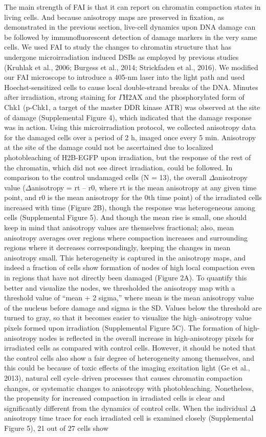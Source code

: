 The main strength of FAI is that it can report on chromatin compaction states in living cells. And because anisotropy maps are preserved in fixation, as demonstrated in the previous section, live-cell dynamics upon DNA damage can be followed by immunofluorescent detection of damage markers in the very same cells. We used FAI to study the changes to chromatin structure that has undergone microirradiation induced DSBs as employed by previous studies (Kruhlak et al., 2006; Burgess et al., 2014; Strickfaden et al., 2016). We modified our FAI microscope to introduce a 405-nm laser into the light path and used Hoechst-sensitized cells to cause local double-strand breaks of the DNA. Minutes after irradiation, strong staining for $\Gamma$H2AX and the phosphorylated form of Chk1 (p-Chk1, a target of the master DDR kinase ATR) was observed at the site of damage (Supplemental Figure 4), which indicated that the damage response was in action. Using this microirradiation protocol, we collected anisotropy data for the damaged cells over a period of 2 h, imaged once every 5 min. Anisotropy at the site of the damage could not be ascertained due to localized photobleaching of H2B-EGFP upon irradiation, but the response of the rest of the chromatin, which did not see direct irradiation, could be followed. In comparison to the control undamaged cells (N = 13), the overall $\Delta$anisotropy value ($\Delta$anisotropy = rt – r0, where rt is the mean anisotropy at any given time point, and r0 is the mean anisotropy for the 0th time point) of the irradiated cells increased with time (Figure 2B), though the response was heterogeneous among cells (Supplemental Figure 5). And though the mean rise is small, one should keep in mind that anisotropy values are themselves fractional; also, mean anisotropy averages over regions where compaction increases and surrounding regions where it decreases correspondingly, keeping the changes in mean anisotropy small. This heterogeneity is captured in the anisotropy maps, and indeed a fraction of cells show formation of nodes of high local compaction even in regions that have not directly been damaged (Figure 2A). To quantify this better and visualize the nodes, we thresholded the anisotropy map with a threshold value of “mean + 2 sigma,” where mean is the mean anisotropy value of the nucleus before damage and sigma is the SD. Values below the threshold are turned to gray, so that it becomes easier to visualize the high–anisotropy value pixels formed upon irradiation (Supplemental Figure 5C). The formation of high-anisotropy nodes is reflected in the overall increase in high-anisotropy pixels for irradiated cells as compared with control cells. However, it should be noted that the control cells also show a fair degree of heterogeneity among themselves, and this could be because of toxic effects of the imaging excitation light (Ge et al., 2013), natural cell cycle–driven processes that causes chromatin compaction changes, or systematic changes to anisotropy with photobleaching. Nonetheless, the propensity for increased compaction in irradiated cells is clear and significantly different from the dynamics of control cells. When the individual $\Delta$anisotropy time trace for each irradiated cell is examined closely (Supplemental Figure 5), 21 out of 27 cells show 